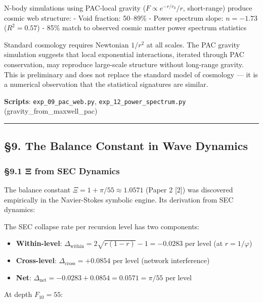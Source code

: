 \documentclass[
  11pt,
  a4paper]{article}
\providecommand{\tightlist}{%
  \setlength{\itemsep}{0pt}\setlength{\parskip}{0pt}}
\begin{document}
N-body simulations using PAC-local gravity (\(F \propto e^{-r/r_0}/r\),
short-range) produce cosmic web structure: - Void fraction: 50--89\% -
Power spectrum slope: \(n = -1.73\) (\(R^2 = 0.57\)) - 85\% match to
observed cosmic matter power spectrum statistics

Standard cosmology requires Newtonian \(1/r^2\) at all scales. The PAC
gravity simulation suggests that local exponential interactions,
iterated through PAC conservation, may reproduce large-scale structure
without long-range gravity. This is preliminary and does not replace the
standard model of cosmology --- it is a numerical observation that the
statistical signatures are similar.

\textbf{Scripts}: \texttt{exp\_09\_pac\_web.py},
\texttt{exp\_12\_power\_spectrum.py} (gravity\_from\_maxwell\_pac)

\begin{center}\rule{0.5\linewidth}{0.5pt}\end{center}

\subsection{§9. The Balance Constant in Wave
Dynamics}\label{the-balance-constant-in-wave-dynamics}

\subsubsection{§9.1 Ξ from SEC Dynamics}\label{ux3be-from-sec-dynamics}

The balance constant \(\Xi = 1 + \pi/55 \approx 1.0571\) (Paper 2
{[}2{]}) was discovered empirically in the Navier-Stokes symbolic
engine. Its derivation from SEC dynamics:

The SEC collapse rate per recursion level has two components:

\begin{itemize}
\tightlist
\item
  \textbf{Within-level}:
  \(\Delta_\text{within} = 2\sqrt{r(1-r)} - 1 = -0.0283\) per level (at
  \(r = 1/\varphi\))
\item
  \textbf{Cross-level}: \(\Delta_\text{cross} = +0.0854\) per level
  (network interference)
\item
  \textbf{Net}:
  \(\Delta_\text{net} = -0.0283 + 0.0854 = 0.0571 = \pi/55\) per level
\end{itemize}

At depth \(F_{10} = 55\):
\end{document}
